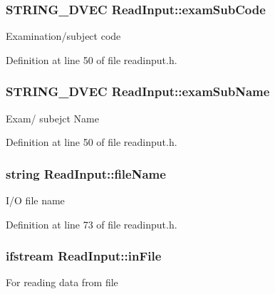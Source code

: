 \hypertarget{classReadInput_a81eee5f7478e5d2d76afad814a6c4e3e}{
\subsubsection[{exam\-Sub\-Code}]{\setlength{\rightskip}{0pt plus 5cm}S\-T\-R\-I\-N\-G\-\_\-D\-V\-E\-C Read\-Input\-::exam\-Sub\-Code\hspace{0.3cm}{\ttfamily [protected]}}}\label{classReadInput_a81eee5f7478e5d2d76afad814a6c4e3e}
Examination/subject code 

Definition at line 50 of file readinput.\-h.

\hypertarget{classReadInput_a6ac62618d1b89d823230ae93c7b85c3b}{
\subsubsection[{exam\-Sub\-Name}]{\setlength{\rightskip}{0pt plus 5cm}S\-T\-R\-I\-N\-G\-\_\-D\-V\-E\-C Read\-Input\-::exam\-Sub\-Name\hspace{0.3cm}{\ttfamily [protected]}}}\label{classReadInput_a6ac62618d1b89d823230ae93c7b85c3b}
Exam/ subejct Name 

Definition at line 50 of file readinput.\-h.

\hypertarget{classReadInput_a834acf783052b5b2f129644b4accaadc}{
\subsubsection[{file\-Name}]{\setlength{\rightskip}{0pt plus 5cm}string Read\-Input\-::file\-Name\hspace{0.3cm}{\ttfamily [protected]}}}\label{classReadInput_a834acf783052b5b2f129644b4accaadc}
I/\-O file name 

Definition at line 73 of file readinput.\-h.

\hypertarget{classReadInput_afe0f493fcb2da1f644445501823fd0e2}{
\subsubsection[{in\-File}]{\setlength{\rightskip}{0pt plus 5cm}ifstream Read\-Input\-::in\-File\hspace{0.3cm}{\ttfamily [protected]}}}\label{classReadInput_afe0f493fcb2da1f644445501823fd0e2}
For reading data from file 


